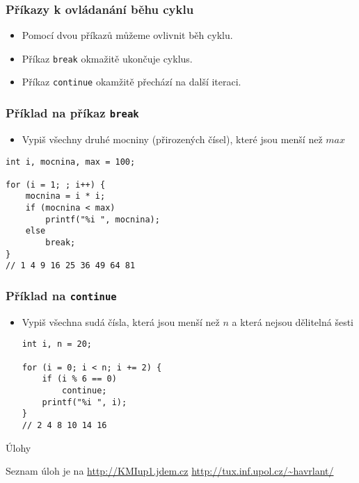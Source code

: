 \documentclass{beamer}
\newenvironment{itemizex}%
  {\large \begin{itemize}%
    \setlength{\itemsep}{8pt}%
    \setlength{\parskip}{8pt}}%
  {\end{itemize}}
\begin{document}
\begin{frame}[t,fragile]\frametitle{Příkazy k ovládanání běhu cyklu} 
  \begin{itemizex}
    \item Pomocí dvou příkazů můžeme ovlivnit běh cyklu.
    \item Příkaz \texttt{break} okmažitě ukončuje cyklus.
    \item Příkaz \texttt{continue} okamžitě přechází na další iteraci.
  \end{itemizex}
\end{frame}



\begin{frame}[t,fragile]\frametitle{Příklad na příkaz \texttt{break}} 
\begin{itemizex}
  \item Vypiš všechny druhé mocniny (přirozených čísel), které jsou menší než $max$ 
\end{itemizex}
\begin{verbatim} 
int i, mocnina, max = 100;

for (i = 1; ; i++) {
    mocnina = i * i;
    if (mocnina < max) 
        printf("%i ", mocnina);
    else
        break;
}
// 1 4 9 16 25 36 49 64 81
\end{verbatim}
\end{frame}


\begin{frame}[t,fragile]\frametitle{Příklad na \texttt{continue}} 
\begin{itemizex}
  \item Vypiš všechna sudá čísla, která jsou menší než $n$ a která nejsou dělitelná šesti
\begin{verbatim} 
int i, n = 20;

for (i = 0; i < n; i += 2) {
    if (i % 6 == 0)
        continue;
    printf("%i ", i);
}
// 2 4 8 10 14 16 
\end{verbatim}
\end{itemizex}
\end{frame}

\begin{frame}[t,fragile]{Úlohy}
\begin{center}
\vskip 1cm
{\Large Seznam úloh je na \url{http://KMIup1.jdem.cz}}
\vskip 2cm
\url{http://tux.inf.upol.cz/~havrlant/}
\end{center}
\end{frame}
\end{document}
